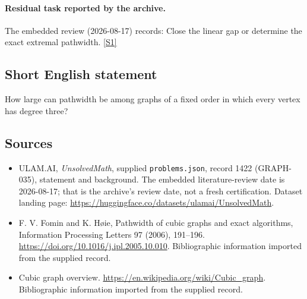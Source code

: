 \documentclass[11pt,a4paper]{article}
\newcommand{\sref}[2]{\hyperlink{source:#1:#2}{[S#2]}}
\begin{document}
\paragraph{Residual task reported by the archive.}

The embedded review (2026-08-17) records: Close the linear gap or determine the exact extremal pathwidth. \sref{1422}{1}

\subsection{Short English statement}

How large can pathwidth be among graphs of a fixed order in which every vertex has degree three?

\subsection{Sources}

{\small

\begin{itemize}

\item[\hypertarget{source:1422:1}{S1}] ULAM.AI, \emph{UnsolvedMath}, supplied \texttt{problems.json}, record 1422 (GRAPH-035), statement and background. The embedded literature-review date is 2026-08-17; that is the archive’s review date, not a fresh certification. Dataset landing page: \url{https://huggingface.co/datasets/ulamai/UnsolvedMath}.

\item[\hypertarget{source:1422:2}{S2}] F. V. Fomin and K. Høie, Pathwidth of cubic graphs and exact algorithms, Information Processing Letters 97 (2006), 191--196. \url{https://doi.org/10.1016/j.ipl.2005.10.010}. Bibliographic information imported from the supplied record.

\item[\hypertarget{source:1422:3}{S3}] Cubic graph overview. \url{https://en.wikipedia.org/wiki/Cubic_graph}. Bibliographic information imported from the supplied record.

\end{itemize}

}

\label{end:1422}
\end{document}
